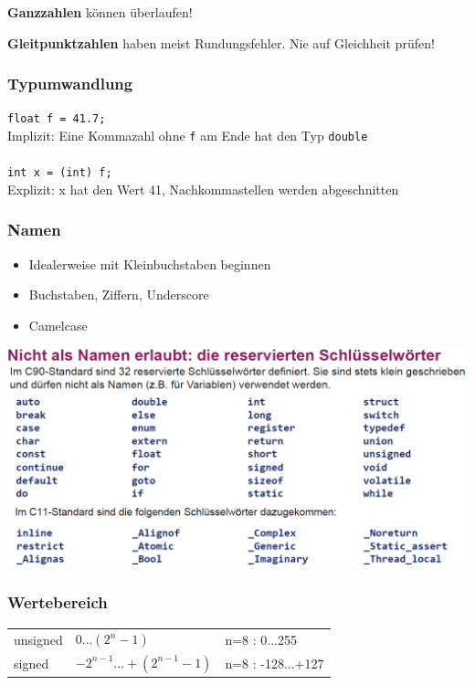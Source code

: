  			\textbf{Ganzzahlen} können überlaufen!

			\textbf{Gleitpunktzahlen} haben meist Rundungsfehler. Nie auf Gleichheit prüfen!

		\subsubsection{Typumwandlung}
			\verb|float f = 41.7;|\\
			Implizit: Eine Kommazahl ohne \verb|f| am Ende hat den Typ \verb|double|
			\\
			\\
			\verb|int x = (int) f;|\\
			Explizit: x hat den Wert 41, Nachkommastellen werden abgeschnitten

		\subsubsection{Namen}
			\begin{minipage}{0.35\linewidth}
				\begin{itemize}
					\item Idealerweise mit Kleinbuchstaben beginnen
					\item Buchstaben, Ziffern, Underscore
					\item Camelcase
				\end{itemize}
			\end{minipage}
			\hfill
			\begin{minipage}{0.6\linewidth}
				\includegraphics[width=1\linewidth]{Bilder/verbotene_namen.png}
			\end{minipage}

		\subsubsection{Wertebereich}
			\begin{tabular}{lll}
				unsigned & 0...$(2^n-1)$               & n=8 : 0...255 \\
				signed   & $-2^{n-1}...+(2^{n-1}-1)$ & n=8 : -128...+127 \\
			\end{tabular}
		
